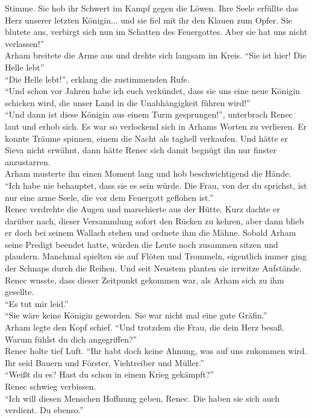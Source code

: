 Stimme. Sie hob ihr Schwert im Kampf gegen die Löwen. Ihre Seele erfüllte das Herz unserer letzten 
Königin... und sie fiel mit ihr den Klauen zum Opfer. Sie blutete aus, verbirgt sich nun im 
Schatten des Feuergottes. Aber sie hat uns nicht verlassen!''\\
Arham breitete die Arme aus und drehte sich langsam im Kreis. ``Sie ist hier! Die Helle lebt''\\
``Die Helle lebt!'', erklang die zustimmenden Rufe.\\
``Und schon vor Jahren habe ich euch verkündet, dass sie uns eine neue Königin schicken wird, die 
unser Land in die Unabhängigkeit führen wird!''\\
``Und dann ist diese Königin aus einem Turm gesprungen!'', unterbrach Renec laut und erhob sich. Es 
war so verlockend sich in Arhams Worten zu verlieren. Er konnte Träume spinnen, einem die Nacht als 
taghell verkaufen. Und hätte er Sieva nicht erwähnt, dann hätte Renec sich damit begnügt ihn nur 
finster anzustarren.\\
Arham musterte ihn einen Moment lang und hob beschwichtigend die Hände. ``Ich habe nie behauptet, 
dass sie es sein würde. Die Frau, von der du sprichst, ist nur eine arme Seele, die vor dem 
Feuergott geflohen ist.''\\
Renec verdrehte die Augen und marschierte aus der Hütte. Kurz dachte er darüber nach, dieser 
Versammlung sofort den Rücken zu kehren, aber dann blieb er doch bei seinem Wallach stehen und 
ordnete ihm die Mähne. Sobald Arham seine Predigt beendet hatte, würden die Leute noch zusammen 
sitzen und plaudern. Manchmal spielten sie auf Flöten und Trommeln, eigentlich immer ging der 
Schnaps durch die Reihen. Und seit Neustem planten sie irrwitze Aufstände. Renec wusste, dass 
dieser Zeitpunkt gekommen war, als Arham sich zu ihm gesellte.\\
``Es tut mir leid.''\\
``Sie wäre keine Königin geworden. Sie war nicht mal eine gute Gräfin.''\\
Arham legte den Kopf schief. ``Und trotzdem die Frau, die dein Herz besaß. Warum fühlst du dich 
angegriffen?''\\
Renec holte tief Luft. ``Ihr habt doch keine Ahnung, was auf uns zukommen wird. Ihr seid Bauern 
und Förster, Viehtreiber und Müller.''\\
``Weißt du es? Hast du schon in einem Krieg gekämpft?''\\
Renec schwieg verbissen.\\
``Ich will diesen Menschen Hoffnung geben, Renec. Die haben sie sich auch verdient. Du ebenso.''\\
